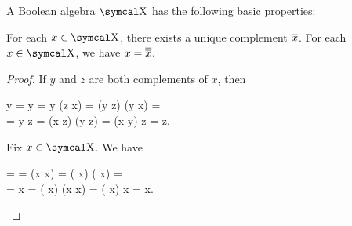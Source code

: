 \begin{proposition}\label{thm:boolean_algebra_properties}
  A Boolean algebra \( \CX \) has the following basic properties:
  \begin{PropEnum}
     For each \( x \in \CX \), there exists a unique complement \( \overline{x} \).
     For each \( x \in \CX \), we have \( x = \overline{\overline{x}} \).
  \end{PropEnum}
\end{proposition}
\begin{proof}
   If \( y \) and \( z \) are both complements of \( x \), then
  \begin{BreakableAlign*}
    y
    =
    y \wedge \top
    =
    y \wedge (z \vee x)
    =
    (y \wedge z) \vee (y \wedge x)
    = \\ =
    y \wedge z
    =
    (x \wedge z) \vee (y \wedge z)
    =
    (x \vee y) \wedge z
    =
    z.
  \end{BreakableAlign*}

   Fix \( x \in \CX \). We have
  \begin{BreakableAlign*}
    =
     \wedge \top
    =
     \wedge (\Ol x \vee x)
    =
    ( \wedge \Ol x) \vee ( \wedge x)
    = \\ =
     \wedge x
    =
    ( \wedge x) \vee (\Ol x \wedge x)
    =
    ( \vee \Ol x) \wedge x
    =
    x.
  \end{BreakableAlign*}
\end{proof}

